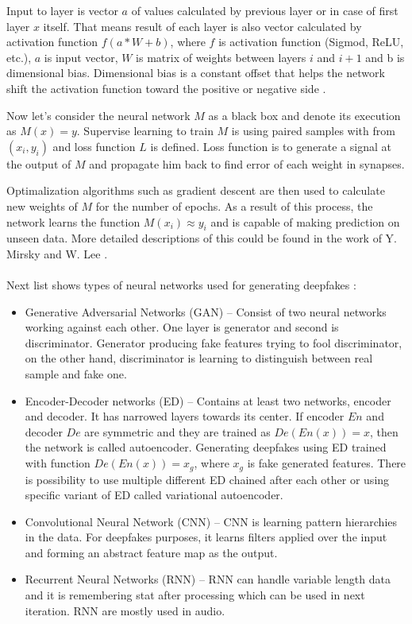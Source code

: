 Input to layer is vector \(a\) of values calculated by previous layer or in case of first layer \(x\) itself. That means result of each layer is also vector calculated by activation function \(f(a*W+b)\), where \(f\) is activation function (Sigmod, ReLU, etc.), \(a\) is input vector, \(W\) is matrix of weights between layers \(i\) and \(i+1\) and b is dimensional bias. Dimensional bias is a constant offset that helps the network shift the activation function toward the positive or negative side \cite{NeuralNetworkBias}.

Now let’s consider the neural network \(M\) as a black box and denote its execution as \(M(x) = y\). Supervise learning to train \(M\) is using paired samples with from \((x_i, y_i)\) and loss function \(L\) is defined. Loss function is to generate a signal at the output of \(M\) and propagate him back to find error of each weight in synapses.

Optimalization algorithms such as gradient descent are then used to calculate new weights of \(M\) for the number of epochs. As a result of this process, the network learns the function \(M(x_i) \approx y_i\) and is capable of making prediction on unseen data. More detailed descriptions of this could be found in the work of Y. Mirsky and W. Lee \cite{CreationandDetectionofDeepfakes}.
\\\\
Next list shows types of neural networks used for generating deepfakes \cite{CreationandDetectionofDeepfakes}:

\begin{itemize}
\item Generative Adversarial Networks (GAN) – Consist of two neural networks working against each other. One layer is generator and second is discriminator. Generator producing fake features trying to fool discriminator, on the other hand, discriminator is learning to distinguish between real sample and fake one.
\item Encoder-Decoder networks (ED) – Contains at least two networks, encoder and decoder. It has narrowed layers towards its center. If encoder \(En\) and decoder \(De\) are symmetric and they are trained as \(De(En(x)) = x\), then the network is called autoencoder. Generating deepfakes using ED trained with function \(De(En(x)) = x_g\), where \(x_g\) is fake generated features. There is possibility to use multiple different ED chained after each other or using specific variant of ED called variational autoencoder.
\item Convolutional Neural Network (CNN) – CNN is learning pattern hierarchies in the data. For deepfakes purposes, it learns filters applied over the input and forming an abstract feature map as the output.
\item Recurrent Neural Networks (RNN) – RNN can handle variable length data and it is remembering stat after processing which can be used in next iteration. RNN are mostly used in audio.
\end{itemize}

